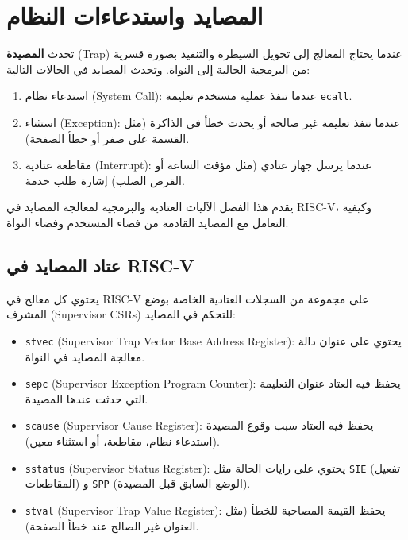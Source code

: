 \chapter{المصايد واستدعاءات النظام}
\label{CH:TRAP}

تحدث \textbf{المصيدة} (Trap) عندما يحتاج المعالج إلى تحويل السيطرة والتنفيذ بصورة قسرية من البرمجية الحالية إلى النواة.
وتحدث المصايد في الحالات التالية:
\begin{enumerate}
  \item استدعاء نظام (System Call): عندما تنفذ عملية مستخدم تعليمة \texttt{ecall}.
  \item استثناء (Exception): عندما تنفذ تعليمة غير صالحة أو يحدث خطأ في الذاكرة (مثل القسمة على صفر أو خطأ الصفحة).
  \item مقاطعة عتادية (Interrupt): عندما يرسل جهاز عتادي (مثل مؤقت الساعة أو القرص الصلب) إشارة طلب خدمة.
\end{enumerate}

يقدم هذا الفصل الآليات العتادية والبرمجية لمعالجة المصايد في RISC-V، وكيفية التعامل مع المصايد القادمة من فضاء المستخدم وفضاء النواة.

\section{عتاد المصايد في RISC-V}
\label{sec:riscv_trap_machinery}

يحتوي كل معالج في RISC-V على مجموعة من السجلات العتادية الخاصة بوضع المشرف (Supervisor CSRs) للتحكم في المصايد:
\begin{itemize}
  \item \texttt{stvec} (Supervisor Trap Vector Base Address Register): يحتوي على عنوان دالة معالجة المصايد في النواة.
  \item \texttt{sepc} (Supervisor Exception Program Counter): يحفظ فيه العتاد عنوان التعليمة التي حدثت عندها المصيدة.
  \item \texttt{scause} (Supervisor Cause Register): يحفظ فيه العتاد سبب وقوع المصيدة (استدعاء نظام، مقاطعة، أو استثناء معين).
  \item \texttt{sstatus} (Supervisor Status Register): يحتوي على رايات الحالة مثل \texttt{SIE} (تفعيل المقاطعات) و \texttt{SPP} (الوضع السابق قبل المصيدة).
  \item \texttt{stval} (Supervisor Trap Value Register): يحفظ القيمة المصاحبة للخطأ (مثل العنوان غير الصالح عند خطأ الصفحة).
\end{itemize}

